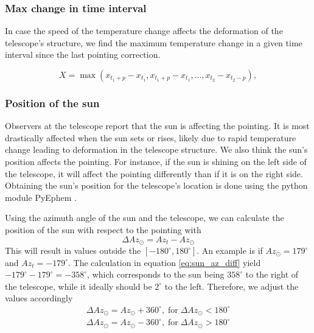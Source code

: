 \subsubsection{Max change in time interval}
In case the speed of the temperature change affects the deformation of the telescope's structure, we find the maximum temperature change in a given time interval since the last pointing correction.

\begin{equation}
    X = \max (x_{t_1+p} - x_{t_1}, x_{t_1+p} - x_{t_1}, \dots, x_{t_2} - x_{t_2-p}),
\end{equation}


\subsubsection{Position of the sun}
Observers at the telescope report that the sun is affecting the pointing.
It is most drastically affected when the sun sets or rises, likely due to rapid temperature change leading to deformation in the telescope structure.
We also think the sun's position affects the pointing.
For instance, if the sun is shining on the left side of the telescope, it will affect the pointing differently than if it is on the right side.
Obtaining the sun's position for the telescope's location is done using the python module PyEphem \cite{ephem}.

Using the azimuth angle of the sun and the telescope, we can calculate the position of the sun with respect to the pointing with
\begin{equation}
    \Delta \textit{Az}_\odot = \textit{Az}_{\textit{t}} - \textit{Az}_\odot
\end{equation}
This will result in values outside the $[-180^\circ,180^\circ]$. An example is if $Az_\odot=179^\circ$ and $Az_t = -179^\circ$.
The calculation in equation \eqref{eq:sun_az_diff} yield $-179^\circ-179^\circ=-358^\circ$,
which corresponds to the sun being $358^\circ$ to the right of the telescope, while it ideally should be $2^\circ$ to the left.
Therefore, we adjust the values accordingly
\begin{align}
    \Delta Az_\odot = Az_\odot +360^\circ, \; \text{for} \; \Delta Az_\odot < 180^\circ\\
    \Delta Az_\odot = Az_\odot -360^\circ, \; \text{for} \; \Delta Az_\odot > 180^\circ
\end{align}

